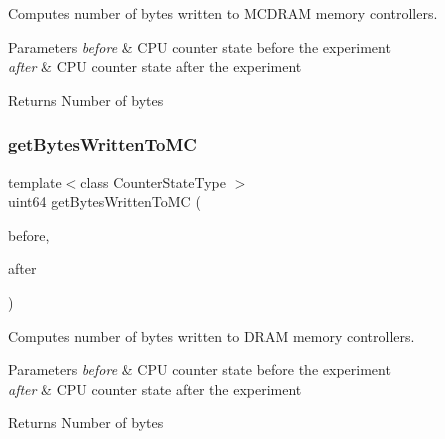 Computes number of bytes written to M\+C\+D\+R\+AM memory controllers. 


\begin{DoxyParams}{Parameters}
{\em before} & C\+PU counter state before the experiment \\
\hline
{\em after} & C\+PU counter state after the experiment \\
\hline
\end{DoxyParams}
\begin{DoxyReturn}{Returns}
Number of bytes 
\end{DoxyReturn}
\mbox{\label{classUncoreCounterState_a24fce7df2ee7140db18ecfcd74fe63d1}} 
\subsubsection{get\+Bytes\+Written\+To\+MC}
{\footnotesize\ttfamily template$<$class Counter\+State\+Type $>$ \\
uint64 get\+Bytes\+Written\+To\+MC (\begin{DoxyParamCaption}\item[{const Counter\+State\+Type \&}]{before,  }\item[{const Counter\+State\+Type \&}]{after }\end{DoxyParamCaption})\hspace{0.3cm}{\ttfamily [friend]}}



Computes number of bytes written to D\+R\+AM memory controllers. 


\begin{DoxyParams}{Parameters}
{\em before} & C\+PU counter state before the experiment \\
\hline
{\em after} & C\+PU counter state after the experiment \\
\hline
\end{DoxyParams}
\begin{DoxyReturn}{Returns}
Number of bytes 
\end{DoxyReturn}
\mbox{\label{classUncoreCounterState_ae86f464068c1f531fd40612fa9ae0c7a}} 

